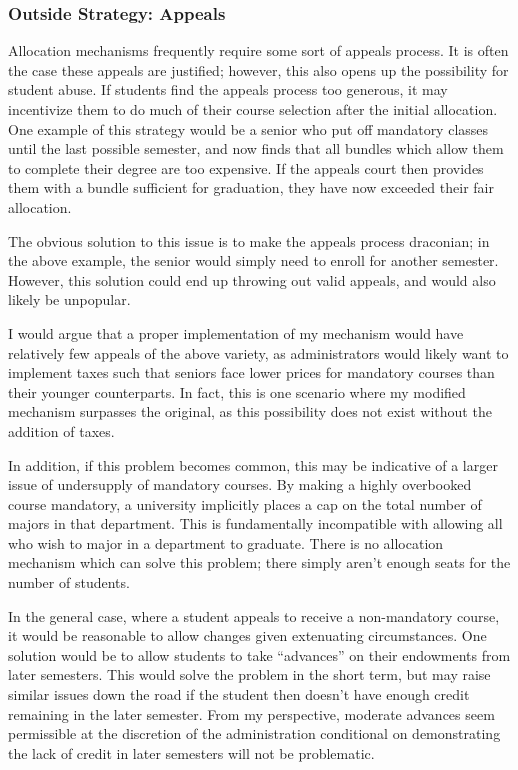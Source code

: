 \documentclass{article}
\begin{document}
\subsubsection{Outside Strategy: Appeals}
Allocation mechanisms frequently require some sort of appeals process. It is often the case these appeals are justified; however, this also opens up the possibility for student abuse. If students find the appeals process too generous, it may incentivize them to do much of their course selection after the initial allocation. One example of this strategy would be a senior who put off mandatory classes until the last possible semester, and now finds that all bundles which allow them to complete their degree are too expensive. If the appeals court then provides them with a bundle sufficient for graduation, they have now exceeded their fair allocation. 

The obvious solution to this issue is to make the appeals process draconian; in the above example, the senior would simply need to enroll for another semester. However, this solution could end up throwing out valid appeals, and would also likely be unpopular. 

I would argue that a proper implementation of my mechanism would have relatively few appeals of the above variety, as administrators would likely want to implement taxes such that seniors face lower prices for mandatory courses than their younger counterparts. In fact, this is one scenario where my modified mechanism surpasses the original, as this possibility does not exist without the addition of taxes.

In addition, if this problem becomes common, this may be indicative of a larger issue of undersupply of mandatory courses. By making a highly overbooked course mandatory, a university implicitly places a cap on the total number of majors in that department. This is fundamentally incompatible with allowing all who wish to major in a department to graduate. There is no allocation mechanism which can solve this problem; there simply aren't enough seats for the number of students. 

In the general case, where a student appeals to receive a non-mandatory course, it would be reasonable to allow changes given extenuating circumstances. One solution would be to allow students to take ``advances'' on their endowments from later semesters. This would solve the problem in the short term, but may raise similar issues down the road if the student then doesn't have enough credit remaining in the later semester. From my perspective, moderate advances seem permissible at the discretion of the administration conditional on demonstrating the lack of credit in later semesters will not be problematic. 
\end{document}
